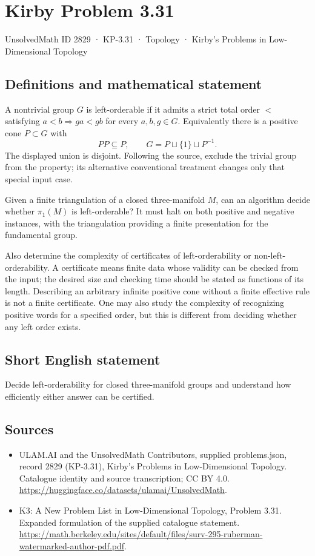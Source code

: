 \documentclass[11pt,a4paper]{article}
\begin{document}
\section*{Kirby Problem 3.31}\label{2829}
{\small UnsolvedMath ID 2829 · KP-3.31 · Topology · Kirby's Problems in Low-Dimensional Topology}
\subsection{Definitions and mathematical statement}
A nontrivial group $G$ is left-orderable if it admits a strict total order
$<$ satisfying $a<b\Rightarrow ga<gb$ for every $a,b,g\in G$. Equivalently
there is a positive cone $P\subset G$ with
\[
 PP\subseteq P,\qquad G=P\sqcup\{1\}\sqcup P^{-1}.
\]
The displayed union is disjoint. Following the source, exclude the trivial
group from the property; its alternative conventional treatment changes
only that special input case.

Given a finite triangulation of a closed three-manifold $M$, can an algorithm
decide whether $\pi_1(M)$ is left-orderable? It must halt on both positive
and negative instances, with the triangulation providing a finite presentation
for the fundamental group.

Also determine the complexity of certificates of left-orderability or
non-left-orderability. A certificate means finite data whose validity can be
checked from the input; the desired size and checking time should be stated
as functions of its length. Describing an arbitrary infinite positive cone
without a finite effective rule is not a finite certificate. One may also
study the complexity of recognizing positive words for a specified order,
but this is different from deciding whether any left order exists.
\subsection{Short English statement}
Decide left-orderability for closed three-manifold groups and understand how efficiently either answer can be certified.
\subsection{Sources}
\begin{itemize}
\item[S1] ULAM.AI and the UnsolvedMath Contributors, supplied problems.json, record 2829 (KP-3.31), Kirby's Problems in Low-Dimensional Topology. Catalogue identity and source transcription; CC BY 4.0.
\url{https://huggingface.co/datasets/ulamai/UnsolvedMath}.
\item[S2] K3: A New Problem List in Low-Dimensional Topology, Problem 3.31. Expanded formulation of the supplied catalogue statement.
\url{https://math.berkeley.edu/sites/default/files/surv-295-ruberman-watermarked-author-pdf.pdf}.
\end{itemize}
\end{document}
